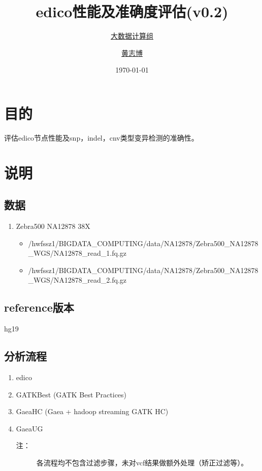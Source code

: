 \documentclass[UTF8,10pt,a4paper]{ctexart}
\title{edico性能及准确度评估{\small (v0.2)}}
\author{\href{http://bigdata.genomics.cn/}{大数据计算组} \and
\href{mailto:huangzhibo@genomics.cn}{黄志博}}
\date{\today}
\begin{document}
\maketitle
\vspace{3em}
\tableofcontents\thispagestyle{empty}
\newpage
\setlength{\parskip}{1ex plus 0.5ex minus 0.2ex}



\section{目的}
评估edico节点性能及snp，indel，cnv类型变异检测的准确性。


\section{说明}

\subsection{数据}
\begin{enumerate}
\item Zebra500 NA12878  38X
{\footnotesize
\begin{itemize}
\item /hwfssz1/BIGDATA\_COMPUTING/data/NA12878/Zebra500\_NA12878\_WGS/NA12878\_read\_1.fq.gz
\item /hwfssz1/BIGDATA\_COMPUTING/data/NA12878/Zebra500\_NA12878\_WGS/NA12878\_read\_2.fq.gz
\end{itemize}
}
\end{enumerate}

\subsection{reference版本}
hg19

\subsection{分析流程}
\begin{enumerate}
\item edico
\item GATKBest (GATK Best Practices)
\item GaeaHC (Gaea + hadoop streaming GATK HC)
\item GaeaUG
\begin{description}
\item[注：]  各流程均不包含过滤步骤，未对vcf结果做额外处理（矫正过滤等）。
\end{description}
\end{enumerate}
\end{document}
